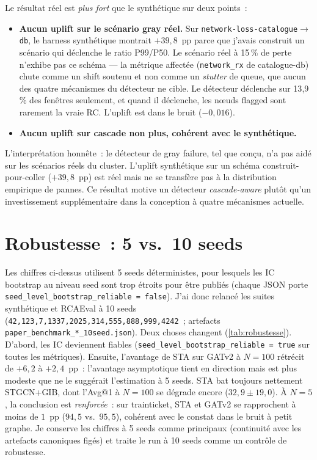 \documentclass[a4paper,11pt,oneside]{report}
\begin{document}
Le r\'esultat r\'eel est \emph{plus fort} que le synth\'etique sur deux points~:
\begin{itemize}
  \item \textbf{Aucun uplift sur le sc\'enario gray r\'eel.} Sur \texttt{network-loss-catalogue$\to$db}, le harness synth\'etique montrait $+39{,}8$~pp parce que j'avais construit un sc\'enario qui d\'eclenche le ratio P99/P50. Le sc\'enario r\'eel \`a 15\,\% de perte n'exhibe pas ce sch\'ema --- la m\'etrique affect\'ee (\texttt{network\_rx} de catalogue-db) chute comme un shift soutenu et non comme un \emph{stutter} de queue, que aucun des quatre m\'ecanismes du d\'etecteur ne cible. Le d\'etecteur d\'eclenche sur 13{,}9\,\% des fen\^etres seulement, et quand il d\'eclenche, les nœuds flagged sont rarement la vraie RC. L'uplift est dans le bruit ($-0{,}016$).
  \item \textbf{Aucun uplift sur cascade non plus, coh\'erent avec le synth\'etique.}
\end{itemize}
L'interpr\'etation honn\^ete~: le d\'etecteur de gray failure, tel que con\c{c}u, n'a pas aid\'e sur les sc\'enarios r\'eels du cluster. L'uplift synth\'etique sur un sch\'ema construit-pour-coller ($+39{,}8$~pp) est r\'eel mais ne se transf\`ere pas \`a la distribution empirique de pannes. Ce r\'esultat motive un d\'etecteur \emph{cascade-aware} plut\^ot qu'un investissement suppl\'ementaire dans la conception \`a quatre m\'ecanismes actuelle.

\section{Robustesse~: 5 vs.\ 10 seeds}
\label{sec:robustesse}

Les chiffres ci-dessus utilisent 5 seeds d\'eterministes, pour lesquels les IC bootstrap au niveau seed sont trop \'etroits pour \^etre publi\'es (chaque JSON porte \texttt{seed\_level\_bootstrap\_reliable = false}). J'ai donc relanc\'e les suites synth\'etique et RCAEval \`a 10 seeds (\texttt{42,123,7,1337,2025,314,555,888,999,4242}~; artefacts \texttt{paper\_benchmark\_*\_10seed.json}). Deux choses changent (\cref{tab:robustesse}). D'abord, les IC deviennent fiables (\texttt{seed\_level\_bootstrap\_reliable = true} sur toutes les m\'etriques). Ensuite, l'avantage de STA sur GATv2 \`a $N{=}100$ r\'etr\'ecit de $+6{,}2$ \`a $+2{,}4$~pp~: l'avantage asymptotique tient en direction mais est plus modeste que ne le sugg\'erait l'estimation \`a 5 seeds. STA bat toujours nettement STGCN+GIB, dont l'Avg@1 \`a $N{=}100$ se d\'egrade encore ($32{,}9 \pm 19{,}0$). \`A $N{=}5$, la conclusion est \emph{renforc\'ee}~: sur trainticket, STA et GATv2 se rapprochent \`a moins de $1$~pp ($94{,}5$ vs.\ $95{,}5$), coh\'erent avec le constat \og dans le bruit \fg{} \`a petit graphe. Je conserve les chiffres \`a 5 seeds comme principaux (continuit\'e avec les artefacts canoniques fig\'es) et traite le run \`a 10 seeds comme un contr\^ole de robustesse.
\end{document}
